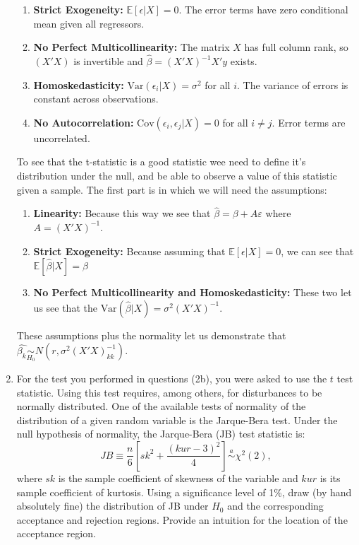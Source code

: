 \documentclass[12pt,a4paper]{article}
\begin{document}
\begin{enumerate}[label=(\alph*)]
\begin{enumerate}
      \item \textbf{Strict Exogeneity:} $\mathbb{E}[\epsilon | X] = 0$. The error terms have zero conditional mean given all regressors.

      \item \textbf{No Perfect Multicollinearity:} The matrix $X$ has full column rank, so $(X'X)$ is invertible and $\hat{\beta} = (X'X)^{-1}X'y$ exists.

      \item \textbf{Homoskedasticity:} $\text{Var}(\epsilon_i | X) = \sigma^2$ for all $i$. The variance of errors is constant across observations.

      \item \textbf{No Autocorrelation:} $\text{Cov}(\epsilon_i, \epsilon_j | X) = 0$ for all $i \neq j$. Error terms are uncorrelated.
      \end{enumerate}

    To see that the t-statistic is a good statistic wee need to define it's distribution under the null, and be able to observe a value of this statistic given a sample. The first part is in which we will need the assumptions:
    
    \begin{enumerate}[label=\arabic*.]
      \item \textbf{Linearity:} Because this way we see that $\hat{\beta}= \beta + A\varepsilon$ where $A = (X'X)^{-1}$.

      \item \textbf{Strict Exogeneity:} Because assuming that $\mathbb{E}[\epsilon | X] = 0$, we can see that $\mathbb{E}[\hat{\beta} | X] = \beta$

      \item \textbf{No Perfect Multicollinearity and Homoskedasticity:} These two let us see that the $\text{Var}(\hat{\beta }| X) = \sigma^2(X'X)^{-1}$.
      \end{enumerate}

      These assumptions plus the normality let us demonstrate that $\hat{\beta_k} \underset{H_0}{\sim}
 N(r, \sigma^2(X'X)^{-1}_{kk})$.

    \item For the test you performed in questions (2b), you were asked to use the $t$ test statistic. Using this test requires, among others, for disturbances to be normally distributed. One of the available tests of normality of the distribution of a given random variable is the Jarque-Bera test. Under the null hypothesis of normality, the Jarque-Bera (JB) test statistic is:
  \[
  JB \equiv \frac{n}{6}\left[sk^2 + \frac{(kur - 3)^2}{4}\right] \stackrel{a}{\sim} \chi^2(2),
  \]
  where $sk$ is the sample coefficient of skewness of the variable and $kur$ is its sample coefficient of kurtosis. Using a significance level of 1\%, draw (by hand absolutely fine) the distribution of JB under $H_0$ and the corresponding acceptance and rejection regions. Provide an intuition for the location of the acceptance region.


\end{enumerate}
\end{document}
